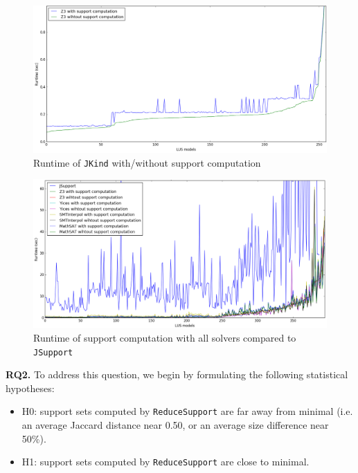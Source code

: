\begin{figure}
  \centering
  \includegraphics[width=\columnwidth]{figs/runtimeZ3.png}
  \caption{Runtime of \texttt{JKind} with/without support computation}\label{fig:runtimez3}
\end{figure}


\begin{figure}
  \centering
  \includegraphics[width=\columnwidth]{figs/runtimeAll.png}
  \caption{Runtime of support computation with all solvers compared to \texttt{JSupport}}\label{fig:runtimeall}
\end{figure}
\noindent{}
 \vspace{6pt}

\textbf{RQ2.} To address this question, we begin by formulating the following statistical hypotheses:

\begin{itemize}
  \item H0: support sets computed by \texttt{ReduceSupport} are far away from minimal (i.e. an average Jaccard distance near 0.50, or an average size difference near 50\%).
  \item H1: support sets computed by \texttt{ReduceSupport} are close to minimal.
\end{itemize}

